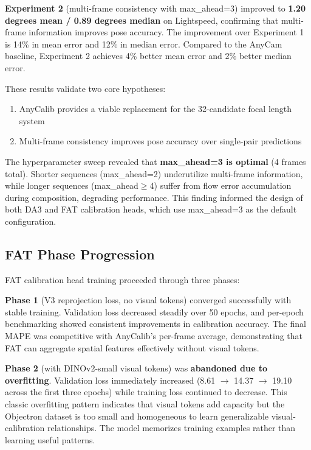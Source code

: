 \textbf{Experiment 2} (multi-frame consistency with max\_ahead=3) improved to \textbf{1.20 degrees mean / 0.89 degrees median} on Lightspeed, confirming that multi-frame information improves pose accuracy. The improvement over Experiment 1 is 14\% in mean error and 12\% in median error. Compared to the AnyCam baseline, Experiment 2 achieves 4\% better mean error and 2\% better median error.

These results validate two core hypotheses:
\begin{enumerate}
    \item AnyCalib provides a viable replacement for the 32-candidate focal length system
    \item Multi-frame consistency improves pose accuracy over single-pair predictions
\end{enumerate}

The hyperparameter sweep revealed that \textbf{max\_ahead=3 is optimal} (4 frames total). Shorter sequences (max\_ahead=2) underutilize multi-frame information, while longer sequences (max\_ahead$\geq$4) suffer from flow error accumulation during composition, degrading performance. This finding informed the design of both DA3 and FAT calibration heads, which use max\_ahead=3 as the default configuration.

\subsection{FAT Phase Progression}\label{sec:fat-validation}

FAT calibration head training proceeded through three phases:

\textbf{Phase 1} (V3 reprojection loss, no visual tokens) converged successfully with stable training. Validation loss decreased steadily over 50 epochs, and per-epoch benchmarking showed consistent improvements in calibration accuracy. The final MAPE was competitive with AnyCalib's per-frame average, demonstrating that FAT can aggregate spatial features effectively without visual tokens.

\textbf{Phase 2} (with DINOv2-small visual tokens) was \textbf{abandoned due to overfitting}. Validation loss immediately increased (8.61 $\to$ 14.37 $\to$ 19.10 across the first three epochs) while training loss continued to decrease. This classic overfitting pattern indicates that visual tokens add capacity but the Objectron dataset is too small and homogeneous to learn generalizable visual-calibration relationships. The model memorizes training examples rather than learning useful patterns.

